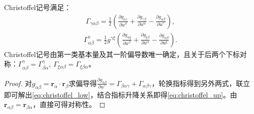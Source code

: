 \documentclass[../../main.tex]{subfiles}%
\begin{document}
\begin{proposition}
Christoffel记号满足：
\begin{align}
\Gamma_{\gamma\alpha\beta}=\frac{1}{2}\left(\frac{\partial g_{\alpha\gamma}}{\partial u^\beta}+\frac{\partial g_{\gamma\beta}}{\partial u^\alpha}-\frac{\partial g_{\alpha\beta}}{\partial u^\gamma}\right),\label{eq:christoffel_low}
\end{align}
\begin{align}
\Gamma^\gamma_{\alpha\beta}=\frac{1}{2}g^{\gamma\xi}\left(\frac{\partial g_{\alpha\xi}}{\partial u^\beta}+\frac{\partial g_{\xi\beta}}{\partial u^\alpha}-\frac{\partial g_{\alpha\beta}}{\partial u^\xi}\right).\label{eq:christoffel_up}
\end{align}
Christoffel记号由第一类基本量及其一阶偏导数唯一确定，且关于后两个下标对称：$\Gamma^\gamma_{\alpha\beta}=\Gamma^\gamma_{\beta\alpha},\ \Gamma_{\xi\alpha\beta}=\Gamma_{\xi\beta\alpha}$。
\end{proposition}
\begin{proof}

对$g_{\alpha\beta}=\boldsymbol{r}_\alpha\cdot\boldsymbol{r}_\beta$求偏导得$\frac{\partial g_{\alpha\beta}}{\partial u^\gamma}=\Gamma_{\beta\alpha\gamma}+\Gamma_{\alpha\beta\gamma}$，轮换指标得到另外两式，联立即可解出\eqref{eq:christoffel_low}，结合指标升降关系即得\eqref{eq:christoffel_up}。由$\boldsymbol{r}_{\alpha\beta}=\boldsymbol{r}_{\beta\alpha}$，直接可得对称性。

\end{proof}
\end{document}
